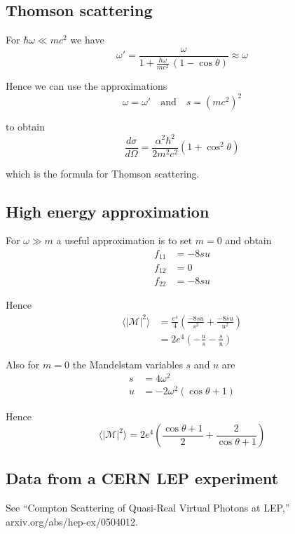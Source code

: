 \documentclass[12pt]{article}
\begin{document}
\subsection*{Thomson scattering}
For $\hbar\omega\ll mc^2$ we have
\begin{equation*}
\omega'=\frac{\omega}{1+\frac{\hbar\omega}{mc^2}\,(1-\cos\theta)}\approx\omega
\end{equation*}

Hence we can use the approximations
\begin{equation*}
\omega=\omega'\quad\text{and}\quad s=(mc^2)^2
\end{equation*}

to obtain
\begin{equation*}
\frac{d\sigma}{d\Omega}=\frac{\alpha^2\hbar^2}{2m^2c^2}\left(1+\cos^2\theta\right)
\end{equation*}

which is the formula for Thomson scattering.

\subsection*{High energy approximation}
For $\omega\gg m$ a useful approximation is to set $m=0$ and obtain
\begin{align*}
f_{11}&=-8su
\\
f_{12}&=0
\\
f_{22}&=-8su
\end{align*}

Hence
\begin{align*}
\langle|\mathcal{M}|^2\rangle
&=\frac{e^4}{4}
\left(\frac{-8su}{s^2}+\frac{-8su}{u^2}\right)
\\
&=2e^4
\left(-\frac{u}{s}-\frac{s}{u}\right)
\end{align*}

Also for $m=0$ the Mandelstam variables $s$ and $u$ are
\begin{align*}
s&=4\omega^2
\\
u&=-2\omega^2(\cos\theta+1)
\end{align*}

Hence
\begin{equation*}
\langle|\mathcal{M}|^2\rangle
=2e^4\left(
\frac{\cos\theta+1}{2}+\frac{2}{\cos\theta+1}
\right)
\end{equation*}

\iffalse

\subsection*{Data from a CERN LEP experiment}
See ``Compton Scattering of Quasi-Real Virtual Photons at LEP,''
arxiv.org/abs/hep-ex/0504012.
\end{document}

